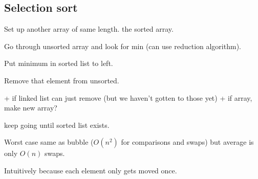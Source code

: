 
\subsection{Selection sort}

Set up another array of same length. the sorted array.

Go through unsorted array and look for min (can use reduction algorithm).

Put minimum in sorted list to left.

Remove that element from unsorted.

+ if linked list can just remove (but we haven't gotten to those yet)
+ if array, make new array?

keep going until sorted list exists.

Worst case same as bubble (\(O(n^2)\) for comparisons and swaps) but average is only \(O(n)\) swaps.

Intuitively because each element only gets moved once.
